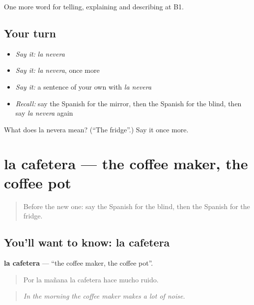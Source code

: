 \begin{grammarlens}[title={What you've built}]
One more word for telling, explaining and describing at B1.
\end{grammarlens}

\subsection*{Your turn}
\begin{itemize}
\raggedright
  \item \emph{Say it:} \emph{la nevera}
  \item \emph{Say it:} \emph{la nevera}, once more
  \item \emph{Say it:} a sentence of your own with \emph{la nevera}
  \item \emph{Recall:} say the Spanish for the mirror, then the Spanish for the blind, then say \emph{la nevera} again
\end{itemize}

\begin{tcolorbox}[breakable,colback=teal!4,colframe=teal!35!black,title={Before you move on}]
What does la nevera mean? (\textquotedblleft{}The fridge\textquotedblright{}.) Say it once more.
\end{tcolorbox}
\section[la cafetera]{la cafetera — the coffee maker, the coffee pot}

\label{lesson:ES-C775-cafetera}



\begin{quote}
Before the new one: say the Spanish for the blind, then the Spanish for the fridge.
\end{quote}

\subsection*{You'll want to know: la cafetera}
\textbf{la cafetera} — \textquotedblleft{}the coffee maker, the coffee pot\textquotedblright{}.

\begin{quote}
Por la mañana la cafetera hace mucho ruido.
\end{quote}

\begin{quote}
\emph{In the morning the coffee maker makes a lot of noise.}
\end{quote}


